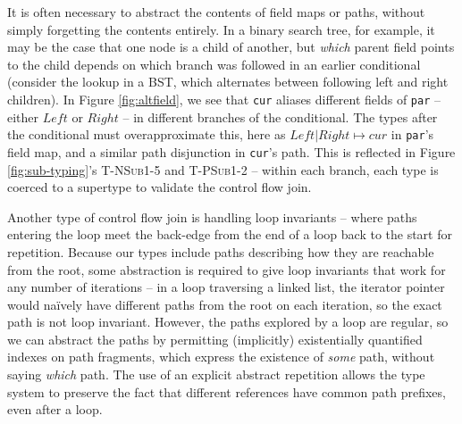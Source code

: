 It is often necessary to abstract the contents of field maps or paths, without simply forgetting the contents entirely.  In a binary search tree, for example, it may be the case that one node is a child of another, but \emph{which} parent field points to the child depends on which branch was followed in an earlier conditional (consider the lookup in a BST, which alternates between following left and right children).
In Figure \ref{fig:altfield}, we see that \texttt{cur} aliases different fields of \texttt{par} -- either $Left$ or $Right$ -- in different branches of the conditional.
The types after the conditional must overapproximate this, here as $Left|Right\mapsto cur$ in \texttt{par}'s field map, and a similar path disjunction in \texttt{cur}'s path.
This is reflected in Figure \ref{fig:sub-typing}'s \textsc{T-NSub1-5} and \textsc{T-PSub1-2} -- within each branch, each type is coerced to a supertype to validate the control flow join.

Another type of control flow join is handling loop invariants -- where paths entering the loop meet the back-edge from the end of a loop back to the start for repetition.
Because our types include paths describing how they are reachable from the root, some abstraction is required to give loop invariants that work for any number of iterations -- in a loop traversing a linked list, the iterator pointer would na\"ively have different paths from the root on each iteration, so the exact path is not loop invariant. However, the paths explored by a loop are regular, so we can abstract the paths by permitting (implicitly) existentially quantified indexes on path fragments, which express the existence of \emph{some} path, without saying \emph{which} path. The use of an explicit abstract repetition allows the type system to preserve the fact that different references have common path prefixes, even after a loop.

